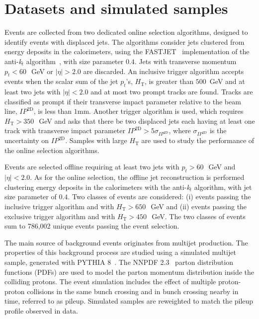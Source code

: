 

\section{Datasets and simulated samples}
\label{sec:samples}

Events are collected from two dedicated online selection algorithms,
designed to identify events with displaced jets.  The algorithms
consider jets clustered from energy deposits in the calorimeters,
using the FASTJET~\cite{fastjet} implementation of the
anti-\textit{k}$_{\textit{t}}$ algorithm~\cite{Cacciari:2008gp}, with
size parameter $0.4$. Jets with transverse momentum $p_{t}<60~$~GeV or
$|\eta|>2.0$ are discarded.  An inclusive trigger algorithm accepts
events when the scalar sum of the jet $p_{t}$'s, $H_{\textrm{T}}$, is
greater than $500$~GeV and at least two jets with $|\eta|<2.0$ and at
most two prompt tracks are found. Tracks are classified as prompt if
their transverse impact parameter relative to the beam line,
$IP^{\textrm{2D}}$, is less than $1$mm.  Another trigger
algorithm is used, which requires $H_{\textrm{T}}>350~$~GeV and asks
that there be two displaced jets each having at least one track with
transverse impact parameter
$IP^{\textrm{2D}}>5\sigma_{IP^{\textrm{2D}}}$,
where $\sigma_{IP^{\textrm{2D}}}$ is the uncertainty on
$IP^{\textrm{2D}}$. Samples with large $H_{\textrm{T}}$ are used to
study the performance of the online selection algorithms. 

Events are selected offline requiring at least two jets with
$p_{t}>60~$~GeV and $|\eta|<2.0$. As for the online selection, the
offline jet reconstruction is performed clustering energy deposits in
the calorimeters with the anti-\textit{k}$_{\textit{t}}$ algorithm,
with jet size parameter of $0.4$. Two classes of events are
considered: (i) events passing the inclusive trigger algorithm and
with $H_{\textrm{T}}>650~$~GeV and (ii) events passing the exclusive
trigger algorithm and with $H_{\textrm{T}}>450~$~GeV. The two classes 
of events sum to 786,002 unique events passing the event selection.  

The main source of background events originates from multijet
production. The properties of this background process are studied
using a simulated multijet sample, generated with
PYTHIA 8~\cite{Sjostrand:2007gs}. The NNPDF 2.3~\cite{NNPDF23}
parton distribution functions (PDFs) are used to model the parton
momentum distribution inside the colliding protons. The event
simulation includes the effect of multiple proton-proton collisions in
the same bunch crossing and in bunch crossing nearby in time, referred
to as pileup. Simulated samples are reweighted to match the pileup
profile observed in data.

